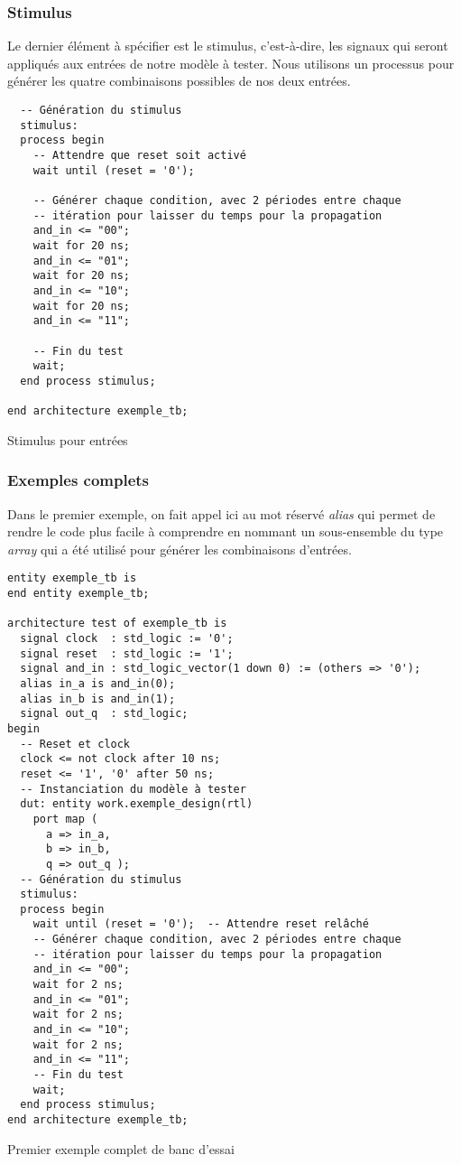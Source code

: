 \documentclass[11pt]{article}
\begin{document}
\subsubsection{Stimulus}
\label{sec:orgfe963e5}

Le dernier élément à spécifier est le stimulus, c'est-à-dire, les
signaux qui seront appliqués aux entrées de notre modèle à
tester. Nous utilisons un processus pour générer les quatre
combinaisons possibles de nos deux entrées.

\begin{listing}[htbp]
\begin{verbatim}
  -- Génération du stimulus
  stimulus:
  process begin
    -- Attendre que reset soit activé
    wait until (reset = '0');

    -- Générer chaque condition, avec 2 périodes entre chaque
    -- itération pour laisser du temps pour la propagation
    and_in <= "00";
    wait for 20 ns;
    and_in <= "01";
    wait for 20 ns;
    and_in <= "10";
    wait for 20 ns;
    and_in <= "11";

    -- Fin du test
    wait;
  end process stimulus;

end architecture exemple_tb;
\end{verbatim}
\caption{Stimulus pour entrées}
\end{listing}

\subsubsection{Exemples complets}
\label{sec:org948be56}

Dans le premier exemple, on fait appel ici au mot réservé \emph{alias} qui
permet de rendre le code plus facile à comprendre en nommant un
sous-ensemble du type \emph{array} qui a été utilisé pour générer les
combinaisons d'entrées.

\begin{listing}[htbp]
\begin{verbatim}
entity exemple_tb is
end entity exemple_tb;

architecture test of exemple_tb is
  signal clock  : std_logic := '0';
  signal reset  : std_logic := '1';
  signal and_in : std_logic_vector(1 down 0) := (others => '0');
  alias in_a is and_in(0);
  alias in_b is and_in(1);
  signal out_q  : std_logic;
begin
  -- Reset et clock
  clock <= not clock after 10 ns;
  reset <= '1', '0' after 50 ns;
  -- Instanciation du modèle à tester 
  dut: entity work.exemple_design(rtl)
    port map (
      a => in_a,
      b => in_b,
      q => out_q );
  -- Génération du stimulus
  stimulus:
  process begin
    wait until (reset = '0');  -- Attendre reset relâché
    -- Générer chaque condition, avec 2 périodes entre chaque
    -- itération pour laisser du temps pour la propagation
    and_in <= "00";
    wait for 2 ns;
    and_in <= "01";
    wait for 2 ns;
    and_in <= "10";
    wait for 2 ns;
    and_in <= "11";
    -- Fin du test
    wait;
  end process stimulus;
end architecture exemple_tb;
\end{verbatim}
\caption{Premier exemple complet de banc d'essai}
\end{listing}
\end{document}
